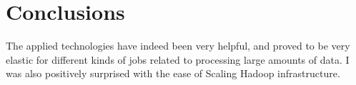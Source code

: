 \chapter{Conclusions}

The applied technologies have indeed been very helpful, and proved to be very elastic for different kinds of jobs related to processing large amounts of data. I was also positively surprised with the ease of Scaling Hadoop infrastructure.